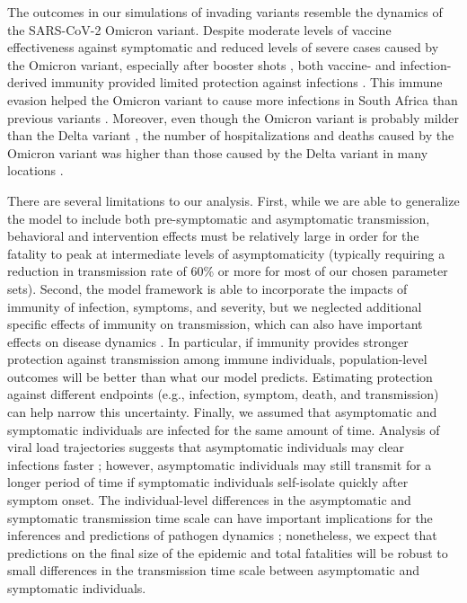 \documentclass[12pt]{article}
\begin{document}
The outcomes in our simulations of invading variants resemble the dynamics of the SARS-CoV-2 Omicron variant.
Despite moderate levels of vaccine effectiveness against symptomatic and reduced levels of severe cases caused by the Omicron variant, especially after booster shots \cite{andres2022omicron}, both vaccine- and infection-derived immunity provided limited protection against infections \cite{pearson2021omicron}.
This immune evasion helped the Omicron variant to cause more infections in South Africa than previous variants \cite{sun2022omicron}.
Moreover, even though the Omicron variant is probably milder than the Delta variant \cite{MENNI20221618,ulloa2022estimates}, the number of hospitalizations and deaths caused by the Omicron variant was higher than those caused by the Delta variant in many locations \cite{Iacobuccio254,faust2022omicron,sigal2022estimating}.

There are several limitations to our analysis.
First, while we are able to generalize the model to include both pre-symptomatic and asymptomatic transmission, behavioral and intervention effects must be relatively large in order for the fatality to peak at intermediate levels of asymptomaticity (typically requiring a reduction in transmission rate of 60\% or more for most of our chosen parameter sets).
Second, the model framework is able to incorporate the impacts of immunity of infection, symptoms, and severity,
but we neglected additional specific effects of immunity on transmission, which can also have important effects on disease dynamics \cite{saad2020immune,gallagher2021indirect}.
In particular, if immunity provides stronger protection against transmission among immune individuals, population-level outcomes will be better than what our model predicts.
Estimating protection against different endpoints (e.g., infection, symptom, death, and transmission) can help narrow this uncertainty.
Finally, we assumed that asymptomatic and symptomatic individuals are infected for the same amount of time.
Analysis of viral load trajectories suggests that asymptomatic individuals may clear infections faster \cite{Kissler2020};
however, asymptomatic individuals may still transmit for a longer period of time if symptomatic individuals self-isolate quickly after symptom onset.
The individual-level differences in the asymptomatic and symptomatic transmission time scale can have important implications for the inferences and predictions of pathogen dynamics \cite{park2020time,harris2022time};
nonetheless, we expect that predictions on the final size of the epidemic and total fatalities will be robust to small differences in the transmission time scale between asymptomatic and symptomatic individuals.
\end{document}
